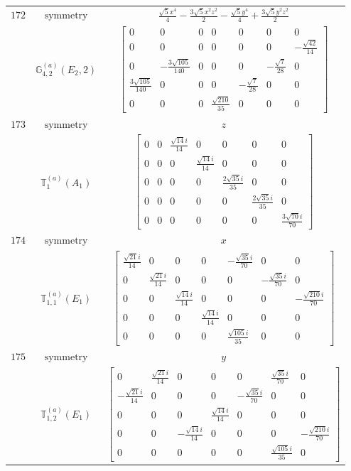 \documentclass[fleqn,8pt,landscape]{jsarticle}
\begin{document}
\begin{longtable}{ccc}
$ 172 $ & $ \text{symmetry} $ & $ \frac{\sqrt{5} x^{4}}{4} - \frac{3 \sqrt{5} x^{2} z^{2}}{2} - \frac{\sqrt{5} y^{4}}{4} + \frac{3 \sqrt{5} y^{2} z^{2}}{2} $ \\
$  $ & $ \mathbb{G}_{4,2}^{(a)}(E_{2},2) $ & $ \begin{bmatrix} 0 & 0 & 0 & 0 & 0 & 0 & 0 \\ 0 & 0 & 0 & 0 & 0 & 0 & - \frac{\sqrt{42}}{14} \\ 0 & - \frac{3 \sqrt{105}}{140} & 0 & 0 & 0 & - \frac{\sqrt{7}}{28} & 0 \\ \frac{3 \sqrt{105}}{140} & 0 & 0 & 0 & - \frac{\sqrt{7}}{28} & 0 & 0 \\ 0 & 0 & 0 & \frac{\sqrt{210}}{35} & 0 & 0 & 0 \end{bmatrix} $ \\ \hline
$ 173 $ & $ \text{symmetry} $ & $ z $ \\
$  $ & $ \mathbb{T}_{1}^{(a)}(A_{1}) $ & $ \begin{bmatrix} 0 & 0 & \frac{\sqrt{14} i}{14} & 0 & 0 & 0 & 0 \\ 0 & 0 & 0 & \frac{\sqrt{14} i}{14} & 0 & 0 & 0 \\ 0 & 0 & 0 & 0 & \frac{2 \sqrt{35} i}{35} & 0 & 0 \\ 0 & 0 & 0 & 0 & 0 & \frac{2 \sqrt{35} i}{35} & 0 \\ 0 & 0 & 0 & 0 & 0 & 0 & \frac{3 \sqrt{70} i}{70} \end{bmatrix} $ \\ \hline
$ 174 $ & $ \text{symmetry} $ & $ x $ \\
$  $ & $ \mathbb{T}_{1,1}^{(a)}(E_{1}) $ & $ \begin{bmatrix} \frac{\sqrt{21} i}{14} & 0 & 0 & 0 & - \frac{\sqrt{35} i}{70} & 0 & 0 \\ 0 & \frac{\sqrt{21} i}{14} & 0 & 0 & 0 & - \frac{\sqrt{35} i}{70} & 0 \\ 0 & 0 & \frac{\sqrt{14} i}{14} & 0 & 0 & 0 & - \frac{\sqrt{210} i}{70} \\ 0 & 0 & 0 & \frac{\sqrt{14} i}{14} & 0 & 0 & 0 \\ 0 & 0 & 0 & 0 & \frac{\sqrt{105} i}{35} & 0 & 0 \end{bmatrix} $ \\ \hline
$ 175 $ & $ \text{symmetry} $ & $ y $ \\
$  $ & $ \mathbb{T}_{1,2}^{(a)}(E_{1}) $ & $ \begin{bmatrix} 0 & \frac{\sqrt{21} i}{14} & 0 & 0 & 0 & \frac{\sqrt{35} i}{70} & 0 \\ - \frac{\sqrt{21} i}{14} & 0 & 0 & 0 & - \frac{\sqrt{35} i}{70} & 0 & 0 \\ 0 & 0 & 0 & \frac{\sqrt{14} i}{14} & 0 & 0 & 0 \\ 0 & 0 & - \frac{\sqrt{14} i}{14} & 0 & 0 & 0 & - \frac{\sqrt{210} i}{70} \\ 0 & 0 & 0 & 0 & 0 & \frac{\sqrt{105} i}{35} & 0 \end{bmatrix} $ \\ \hline

\end{longtable}
\end{document}
